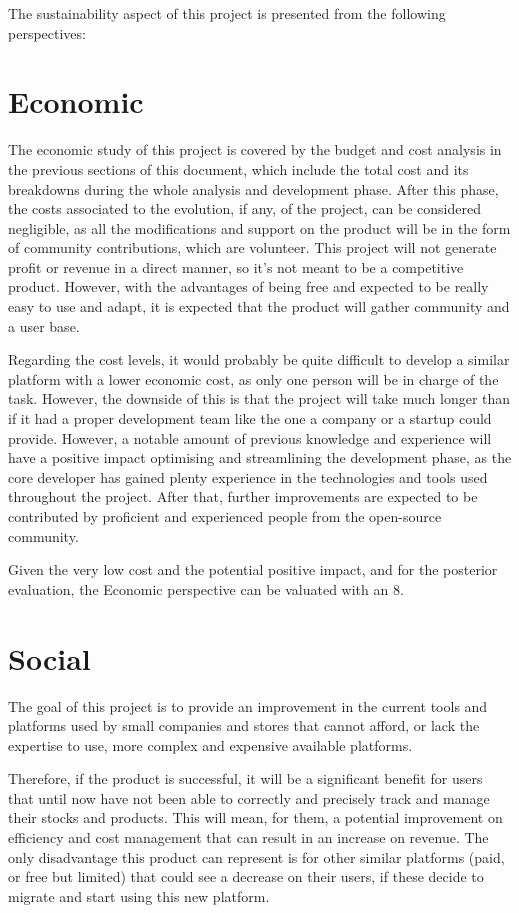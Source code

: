 The sustainability aspect of this project is presented from the following perspectives:

\section{Economic}
\label{sec:131}
The economic study of this project is covered by the budget and cost analysis in the previous sections of this document, which include the total cost and its breakdowns during the whole analysis and development phase. After this phase, the costs associated to the evolution, if any, of the project, can be considered negligible, as all the modifications and support on the product will be in the form of community contributions, which are volunteer. This project will not generate profit or revenue in a direct manner, so it’s not meant to be a competitive product. However, with the advantages of being free and expected to be really easy to use and adapt, it is expected that the product will gather community and a user base.

Regarding the cost levels, it would probably be quite difficult to develop a similar platform with a lower economic cost, as only one person will be in charge of the task. However, the downside of this is that the project will take much longer than if it had a proper development team like the one a company or a startup could provide. However, a notable amount of previous knowledge and experience will have a positive impact optimising and streamlining the development phase, as the core developer has gained plenty experience in the technologies and tools used throughout the project. After that, further improvements are expected to be contributed by proficient and experienced people from the open-source community.

Given the very low cost and the potential positive impact, and for the posterior evaluation, the Economic perspective can be valuated with an 8. 

\section{Social}
\label{sec:132}
The goal of this project is to provide an improvement in the current tools and platforms used by small companies and stores that cannot afford, or lack the expertise to use, more complex and expensive available platforms.

Therefore, if the product is successful, it will be a significant benefit for users that until now have not been able to correctly and precisely track and manage their stocks and products. This will mean, for them, a potential improvement on efficiency and cost management that can result in an increase on revenue. The only disadvantage this product can represent is for other similar platforms (paid, or free but limited) that could see a decrease on their users, if these decide to migrate and start using this new platform.

